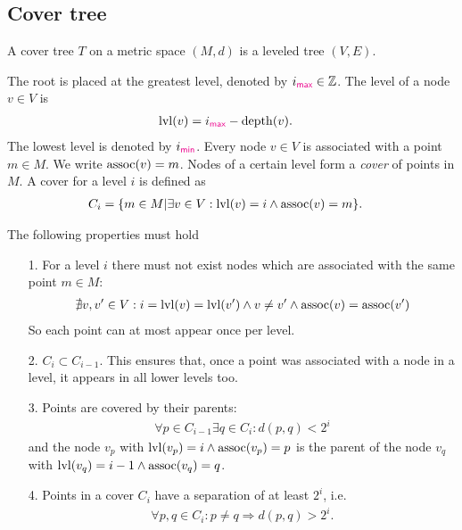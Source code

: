 \subsection{Cover tree}
	\begin{mydef}\label{coverTree}
		A \textnormal{cover tree} $T$ on a metric space $(M, d)$ is a leveled tree $(V, E)$.
		
		The root is placed at the greatest level, denoted by $i_{\textcolor{magenta}{\textsf{max}}} \in \mathbb{Z}$.
		The level of a node $v \in V$ is
		\begin{align*}
			\operatorname{lvl}(v)	&= i_{\textcolor{magenta}{\textsf{max}}} - \operatorname{depth}(v).
		\end{align*}
		The lowest level is denoted by $i_{\textcolor{magenta}{\textsf{min}}}$.
		Every node $v \in V$ is associated with a point $m \in M$. We write $\operatorname{assoc}(v) = m$.
		Nodes of a certain level form a \textit{cover} of points in $M$. A cover for a level $i$ is defined as
		\begin{align*}
			C_i	&= \{m \in M | \exists v \in V : \operatorname{lvl}(v) = i \land \operatorname{assoc}(v) = m\}.
		\end{align*}
		
		The following properties must hold
		\begin{itemize}
			\item[1.] For a level $i$ there must not exist nodes which are associated with the same point $m \in M$:
				\begin{align*}
					\nexists v, v' \in V : i = \operatorname{lvl}(v) = \operatorname{lvl}(v') \land v \neq v' \land \operatorname{assoc}(v) = \operatorname{assoc}(v')
				\end{align*}
				So each point can at most appear once per level.
			\item[2.] $C_i \subset C_{i - 1}$. This ensures that, once a point was associated with a node in a
				level, it appears in all lower levels too.
			\item[3.] Points are covered by their parents:
				\begin{align*}
					\forall p \in C_{i - 1} \exists q \in C_{i}: d(p, q) < 2^i
				\end{align*}
				and the node $v_p$ with $\operatorname{lvl}(v_p) = i \land \operatorname{assoc}(v_p) = p$ is the parent of the node
				$v_q$ with $\operatorname{lvl}(v_q) = i - 1 \land \operatorname{assoc}(v_q) = q$.
			\item[4.] Points in a cover $C_i$ have a separation of at least $2^i$, i.e.
				\begin{align*}
					\forall p, q \in C_i : p \neq q \Rightarrow d(p, q) > 2^i.
				\end{align*}
		\end{itemize}
	\end{mydef}
